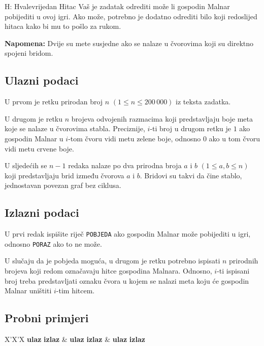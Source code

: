 \begin{statement}[
  timelimit=1 s,
  memorylimit=512 MiB,
]{H: Hvalevrijedan Hitac}
Vaš je zadatak odrediti može li gospodin Malnar pobijediti u ovoj igri. Ako
može, potrebno je dodatno odrediti bilo koji redoslijed hitaca kako bi mu to
pošlo za rukom.

\textbf{Napomena:} Dvije su mete susjedne ako se nalaze u čvorovima koji su
direktno spojeni bridom.

\subsection*{Ulazni podaci}
U prvom je retku prirodan broj $n$ $(1 \le n \le 200\,000)$ iz teksta zadatka.

U drugom je retku $n$ brojeva odvojenih razmacima koji predstavljaju boje meta
koje se nalaze u čvorovima stabla. Preciznije, $i$-ti broj u drugom retku je $1$
ako gospodin Malnar u $i$-tom čvoru vidi metu zelene boje, odnosno $0$ ako u tom
čvoru vidi metu crvene boje.

U sljedećih se $n-1$ redaka nalaze po dva prirodna broja $a$ i $b$ $(1 \le a, b
\le n)$ koji predstavljaju brid između čvorova $a$ i $b$. Bridovi su takvi da
čine stablo, jednostavan povezan graf bez ciklusa.

\subsection*{Izlazni podaci}
U prvi redak ispišite riječ \texttt{POBJEDA} ako gospodin Malnar može
pobijediti u igri, odnosno \texttt{PORAZ} ako to ne može.

U slučaju da je pobjeda moguća, u drugom je retku potrebno ispisati $n$
prirodnih brojeva koji redom označavaju hitce gospodina Malnara. Odnosno,
$i$-ti ispisani broj treba predstavljati oznaku čvora u kojem se nalazi meta
koju će gospodin Malnar uništiti $i$-tim hitcem.

\subsection*{Probni primjeri}
\begin{tabularx}{\textwidth}{X'X'X}
  \textbf{ulaz}
  \linespread{1}{}
  \textbf{izlaz}
  \linespread{1}{} &
  \textbf{ulaz}
  \linespread{1}{}
  \textbf{izlaz}
  \linespread{1}{} &
  \textbf{ulaz}
  \linespread{1}{}
  \textbf{izlaz}
  \linespread{1}{}
\end{tabularx}

\end{statement}

